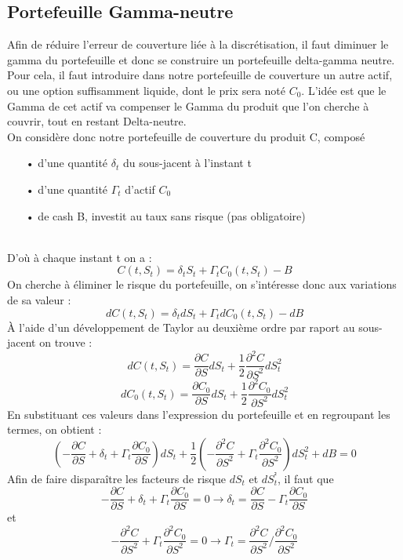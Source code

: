 \documentclass[french,12pt,a4paper]{article}
\begin{document}
\subsection{Portefeuille Gamma-neutre}
Afin de réduire l'erreur de couverture liée à la discrétisation, il faut diminuer le gamma du portefeuille et donc se construire un portefeuille delta-gamma neutre. Pour cela, il faut introduire dans notre portefeuille de couverture un autre actif, ou une option suffisamment liquide, dont le prix sera noté $C_0$. L'idée est que le Gamma de cet actif va compenser le Gamma du produit que l'on cherche à couvrir, tout en restant Delta-neutre. \\
On considère donc notre portefeuille de couverture du produit C, composé
\begin{itemize}
\item[•] d'une quantité $\delta_t$ du sous-jacent à l'instant t
\item[•] d'une quantité $\Gamma_t$ d'actif $C_0$
\item[•] de cash B, investit au taux sans risque (pas obligatoire)
\end{itemize} 
\\
D'où à chaque instant t on a : 
$$ C(t,S_t) = \delta_t S_t + \Gamma_tC_0(t,S_t) - B  $$
On cherche à éliminer le risque du portefeuille, on s'intéresse donc aux variations de sa valeur : 
$$ dC(t, S_t) = \delta_t dS_t + \Gamma_t dC_0(t,S_t) - dB  $$
À l'aide d'un développement de Taylor au deuxième ordre par raport au sous-jacent on trouve : 
$$ dC(t,S_t) = \frac{\partial C}{\partial S} dS_t  + \frac{1}{2} \frac{\partial^2 C}{\partial S^2} dS_{t}^2 $$
$$ dC_0(t,S_t) = \frac{\partial C_0}{\partial S} dS_t  + \frac{1}{2} \frac{\partial^2 C_0}{\partial S^2} dS_{t}^2 $$
En substituant ces valeurs dans l'expression du portefeuille et en regroupant les termes, on obtient : 
$$ (-\frac{\partial C}{\partial S} + \delta_t + \Gamma_t \frac{\partial C_0}{\partial S}) dS_t + \frac{1}{2} ( - \frac{\partial^2 C}{\partial S^2} + \Gamma_t  \frac{\partial^2 C_0}{\partial S^2})dS_{t}^2 + dB = 0   $$
Afin de faire disparaître les facteurs de risque $dS_t$ et $dS_{t}^²$, il faut que
$$ -\frac{\partial C}{\partial S} + \delta_t + \Gamma_t \frac{\partial C_0}{\partial S} = 0 \rightarrow \delta_t = \frac{\partial C}{\partial S} -\Gamma_t \frac{\partial C_0}{\partial S} $$
et 
$$- \frac{\partial^2 C}{\partial S^2} + \Gamma_t  \frac{\partial^2 C_0}{\partial S^2} = 0 \rightarrow \Gamma_t = \frac{\partial^2 C}{\partial S^2} \slash \frac{\partial^2 C_0}{\partial S^2}  $$ 
\end{document}

